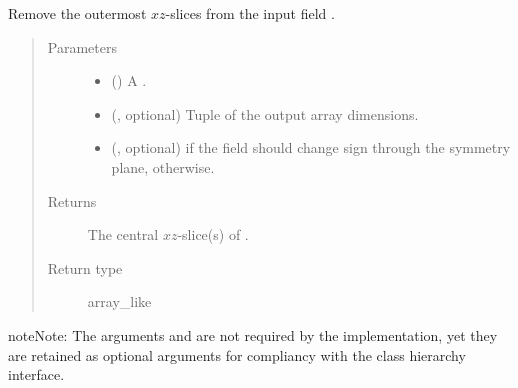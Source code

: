 \documentclass[letterpaper,10pt,english]{sphinxmanual}
\begin{document}
\begin{fulllineitems}

\begin{fulllineitems}
\label{\detokenize{api:tasmania.dycore.horizontal_boundary_relaxed.RelaxedXZ.from_computational_to_physical_domain}}
Remove the  outermost \(xz\)-slices from the input field .
\begin{quote}\begin{description}
\item[{Parameters}] \leavevmode\begin{itemize}
\item {} 
 () \textendash{} A .

\item {} 
 (, optional) \textendash{} Tuple of the output array dimensions.

\item {} 
 (, optional) \textendash{}  if the field should change sign through the symmetry plane,  otherwise.

\end{itemize}

\item[{Returns}] \leavevmode
The central \(xz\)-slice(s) of .

\item[{Return type}] \leavevmode
array\_like

\end{description}\end{quote}

\begin{sphinxadmonition}{note}{Note:}
The arguments  and  are not required by the implementation,
yet they are retained as optional arguments for compliancy with the class hierarchy interface.
\end{sphinxadmonition}

\end{fulllineitems}


\end{fulllineitems}
\end{document}
